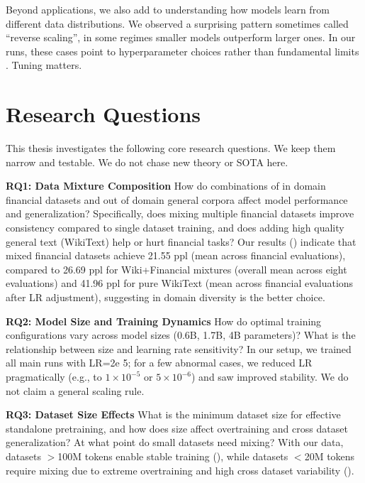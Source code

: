 Beyond applications, we also add to understanding how models learn from different data distributions. We observed a surprising pattern sometimes called ``reverse scaling'', in some regimes smaller models outperform larger ones. In our runs, these cases point to hyperparameter choices rather than fundamental limits \parencite{kaplan2020scaling,hoffmann2022training,mccandlish2018empirical}. Tuning matters.

\section{Research Questions}

This thesis investigates the following core research questions. We keep them narrow and testable. We do not chase new theory or SOTA here.

\textbf{RQ1: Data Mixture Composition}
How do combinations of in domain financial datasets and out of domain general corpora affect model performance and generalization? Specifically, does mixing multiple financial datasets improve consistency compared to single dataset training, and does adding high quality general text (WikiText) help or hurt financial tasks? Our results () indicate that mixed financial datasets achieve 21.55 ppl (mean across financial evaluations), compared to 26.69 ppl for Wiki+Financial mixtures (overall mean across eight evaluations) and 41.96 ppl for pure WikiText (mean across financial evaluations after LR adjustment), suggesting in domain diversity is the better choice.

\textbf{RQ2: Model Size and Training Dynamics}
How do optimal training configurations vary across model sizes (0.6B, 1.7B, 4B parameters)? What is the relationship between size and learning rate sensitivity? In our setup, we trained all main runs with LR=2e 5; for a few abnormal cases, we reduced LR pragmatically (e.g., to $1\times10^{-5}$ or $5\times10^{-6}$) and saw improved stability. We do not claim a general scaling rule.

\textbf{RQ3: Dataset Size Effects}
What is the minimum dataset size for effective standalone pretraining, and how does size affect overtraining and cross dataset generalization? At what point do small datasets need mixing? With our data, datasets $>$100M tokens enable stable training (), while datasets $<$20M tokens require mixing due to extreme overtraining and high cross dataset variability ().

